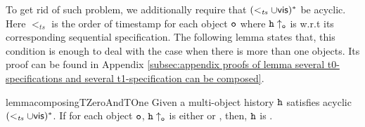 



To get rid of such problem, we additionally require that $(<_{\mathit{ts}} \cup \mathsf{vis})^*$ be acyclic. Here $<_{\mathit{ts}}$ is the order of timestamp for each object $\mathtt{o}$ where $\mathtt{h} \uparrow_{\mathtt{o}}$ is \tonelinearizable{} w.r.t its corresponding sequential specification. The following lemma states that, this condition is enough to deal with the case when there is more than one \tonelinearizable{} objects. Its proof can be found in Appendix \ref{subsec:appendix proofs of lemma several t0-specifications and several t1-specification can be composed}.

\begin{restatable}{lemma}{composingTZeroAndTOne}
\label{lemma:several t0-specifications and several t1-specification can be composed}
Given a multi-object history $\mathtt{h}$ satisfies acyclic $(<_{\mathit{ts}} \cup \mathsf{vis})^*$. If for each object $\mathtt{o}$, $\mathtt{h} \uparrow_{\mathtt{o}}$ is either \tzerolinearizable{} or \tonelinearizable{}, then, $\mathtt{h}$ is \crdtlinearizable{}.
\end{restatable}


